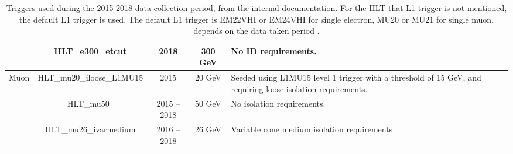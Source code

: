 \begin{table}[!htpb]
\begin{center}
{\begin{tabular}{c|c|c|c|p{7.2cm}}
          & HLT\_e300\_etcut                     &      2018                &         300 GeV    &    No ID requirements. \\
          \hline \hline
          \multirow{3}{*}{Muon}  
          & HLT\_mu20\_iloose\_L1MU15      &      2015           &  20 GeV &   Seeded using L1MU15 level 1 trigger with a threshold of 15 GeV, and requiring loose isolation requirements.\\
          & HLT\_mu50\                     &      2015 -- 2018   &  50 GeV &   No isolation requirements. \\
          & HLT\_mu26\_ivarmedium          &      2016 -- 2018   &  26 GeV &   Variable cone medium isolation requirements \\
          \hline \hline
        \end{tabular}
      }
      \caption{Triggers used during the 2015-2018 data collection period, from the internal documentation.
               For the HLT that L1 trigger is not mentioned, the default L1 trigger is used. 
               The default L1 trigger is EM22VHI or EM24VHI for single electron, 
               MU20 or MU21 for single muon, depends on the data taken period
               \cite{TwikiTriggerNamingRun2}. }
      \label{tab:trigs2015_to_2018}
    \end{center}
  \end{table}